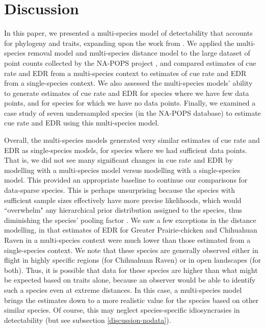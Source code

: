 \documentclass[12pt]{article}
\begin{document}
\section{Discussion}

\par In this paper, we presented a multi-species model of detectability that accounts for phylogeny and traits, expanding upon the work from \citet{solymos_phylogeny_2018}.
We applied the multi-species removal model and multi-species distance model to the large dataset of point counts collected by the NA-POPS project \citep{edwards_point_2023}, and compared estimates of cue rate and EDR from a multi-species context to estimates of cue rate and EDR from a single-species context.
We also assessed the multi-species models' ability to generate estimates of cue rate and EDR for species where we have few data points, and for species for which we have no data points.
Finally, we examined a case study of seven undersampled species (in the NA-POPS database) to estimate cue rate and EDR using this multi-species model.

\par Overall, the multi-species models generated very similar estimates of cue rate and EDR as single-species models, for species where we had sufficient data points.
That is, we did not see many significant changes in cue rate and EDR by modelling with a multi-species model versus modelling with a single-species model.
This provided an appropriate baseline to continue our comparisons for data-sparse species.
This is perhaps unsurprising because the species with sufficient sample sizes effectively have more precise likelihoods, which would ``overwhelm" any hierarchical prior distribution assigned to the species, thus diminishing the species' pooling factor \citep{gelman_bayesian_2006}.
We saw a few exceptions in the distance modelling, in that estimates of EDR for Greater Prairie-chicken and Chihuahuan Raven in a multi-species context were much lower than those estimated from a single-species context.
We note that these species are generally observed either in flight in highly specific regions (for Chihuahuan Raven) or in open landscapes (for both).
Thus, it is possible that data for these species are higher than what might be expected based on traits alone, because an observer would be able to identify such a species even at extreme distances.
In this case, a multi-species model brings the estimates down to a more realistic value for the species based on other similar species.
Of course, this may neglect species-specific idiosyncrasies in detectability (but see subsection \ref{discussion-nodata}).
\end{document}
